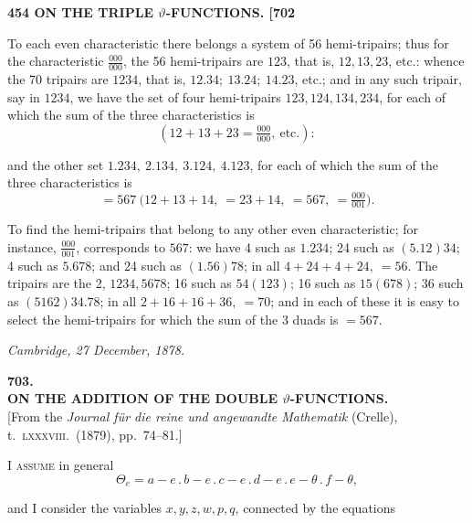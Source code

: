 \documentclass[11pt]{article}
\begin{document}
\bigskip
\noindent\textbf{454 \hfill ON THE TRIPLE $\vartheta$-FUNCTIONS. \hfill [702}

\medskip

To each even characteristic there belongs a system of 56 hemi-tripairs; thus for the characteristic $\tfrac{000}{000}$, the 56 hemi-tripairs are $123$, that is, $12, 13, 23$, etc.: whence the 70 tripairs are $1234$, that is, $12.34;\ 13.24;\ 14.23$, etc.; and in any such tripair, say in $1234$, we have the set of four hemi-tripairs $123, 124, 134, 234$, for each of which the sum of the three characteristics is
\[
\left(12 + 13 + 23 = \tfrac{000}{000},\ \text{etc.}\right):
\]

and the other set $1.234,\ 2.134,\ 3.124,\ 4.123$, for each of which the sum of the three characteristics is
\[
= 567\ \bigl(12 + 13 + 14,\ = 23 + 14,\ = 567,\ = \tfrac{000}{001}\bigr).
\]

To find the hemi-tripairs that belong to any other even characteristic; for instance, $\tfrac{000}{001}$, corresponds to $567$: we have 4 such as $1.234$; 24 such as $(5.12)34$; 4 such as $5.678$; and 24 such as $(1.56)78$; in all $4 + 24 + 4 + 24,\ = 56$. The tripairs are the 2, $1234, 5678$; 16 such as $54(123)$; 16 such as $15(678)$; 36 such as $(5162)34.78$; in all $2 + 16 + 16 + 36,\ = 70$; and in each of these it is easy to select the hemi-tripairs for which the sum of the 3 duads is $= 567$.

\medskip
\hfill\textit{Cambridge, 27 December, 1878.}

\bigskip
\begin{center}
\large\textbf{703.}\\[6pt]
\large\textbf{ON THE ADDITION OF THE DOUBLE $\vartheta$-FUNCTIONS.}\\[6pt]
\small [From the \textit{Journal f\"ur die reine und angewandte Mathematik} (Crelle), t.~\textsc{lxxxviii}.~(1879), pp.~74--81.]
\end{center}

\medskip

I \textsc{assume} in general
\[
\Theta_e = a - e\,.\,b - e\,.\,c - e\,.\,d - e\,.\,e - \theta\,.\,f - \theta,
\]

and I consider the variables $x, y, z, w, p, q$, connected by the equations
\end{document}
